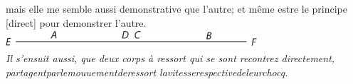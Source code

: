 mais elle me semble aussi demonstrative que l'autre;
et même estre le principe
[direct]
pour demonstrer l'autre.
\pend
\vspace{1em}
\pstart
%
\noindent
\centering
\includegraphics[trim = 0mm -3mm 0mm 0mm, clip, width=0.7\textwidth]{images/LH035,14,02_115v-d3.pdf}\\
\noindent {}%
\pend
\vspace{1em}%
\pstart
{}
\textit{Il s'ensuit aussi, que deux corps à ressort
qui se sont recontrez directement,\hfill
partagent\hfill par\hfill le\hfill mouuement\hfill de\hfill ressort\protect{}\hfill
la\hfill vitesse\hfill respective\hfill de\hfill leur\hfill chocq.}%
